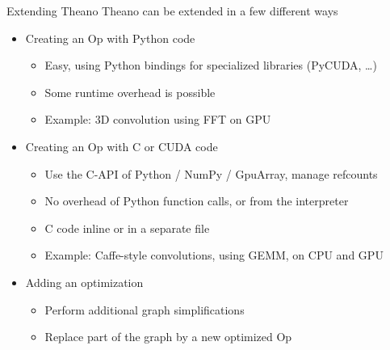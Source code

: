 \documentclass[a4paper,9pt]{beamer}
\begin{document}
\begin{frame}{Extending Theano}
Theano can be extended in a few different ways
  \begin{itemize}
    \item Creating an Op with Python code
      \begin{itemize}
        \item Easy, using Python bindings for specialized libraries (PyCUDA, \ldots)
        \item Some runtime overhead is possible
        \item Example: 3D convolution using FFT on GPU
      \end{itemize}
    \item Creating an Op with C or CUDA code
      \begin{itemize}
        \item Use the C-API of Python / NumPy / GpuArray, manage refcounts
        \item No overhead of Python function calls, or from the interpreter
        \item C code inline or in a separate file
        \item Example: Caffe-style convolutions, using GEMM, on CPU and GPU
      \end{itemize}
    \item Adding an optimization
      \begin{itemize}
        \item Perform additional graph simplifications
        \item Replace part of the graph by a new optimized Op
      \end{itemize}
  \end{itemize}
\end{frame}
\end{document}
